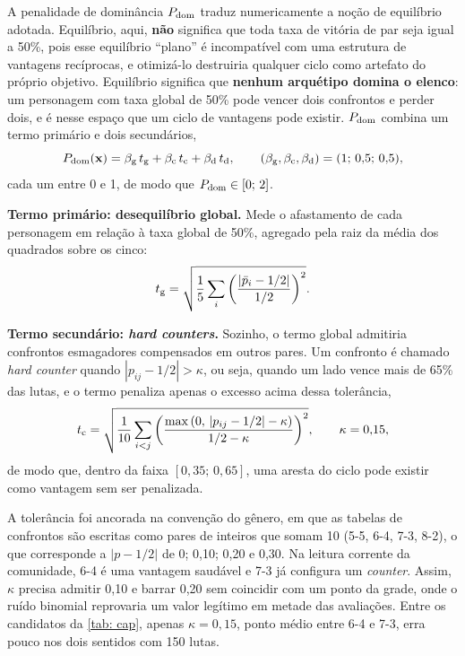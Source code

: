 A penalidade de dominância $P_{\mathrm{dom}}$ traduz numericamente a noção de equilíbrio adotada. Equilíbrio, aqui, \textbf{não} significa que toda taxa de vitória de par seja igual a 50\%, pois esse equilíbrio ``plano'' é incompatível com uma estrutura de vantagens recíprocas, e otimizá-lo destruiria qualquer ciclo como artefato do próprio objetivo. Equilíbrio significa que \textbf{nenhum arquétipo domina o elenco}: um personagem com taxa global de 50\% pode vencer dois confrontos e perder dois, e é nesse espaço que um ciclo de vantagens pode existir. $P_{\mathrm{dom}}$ combina um termo primário e dois secundários,
\begin{equation}
    \label{eq: dominancia}
    P_{\mathrm{dom}}(\mathbf{x}) = \beta_{\mathrm{g}}\, t_{\mathrm{g}} + \beta_{\mathrm{c}}\, t_{\mathrm{c}} + \beta_{\mathrm{d}}\, t_{\mathrm{d}},
    \qquad
    (\beta_{\mathrm{g}}, \beta_{\mathrm{c}}, \beta_{\mathrm{d}}) = (1;\, 0{,}5;\, 0{,}5),
\end{equation}
cada um entre 0 e 1, de modo que $P_{\mathrm{dom}} \in [0;\, 2]$.

\textbf{Termo primário: desequilíbrio global.} Mede o afastamento de cada personagem em relação à taxa global de 50\%, agregado pela raiz da média dos quadrados sobre os cinco:
\begin{equation}
    \label{eq: termo_global}
    t_{\mathrm{g}} = \sqrt{\frac{1}{5} \sum_{i} \left( \frac{|\bar{p}_i - 1/2|}{1/2} \right)^2}.
\end{equation}

\textbf{Termo secundário: \textit{hard counters}.} Sozinho, o termo global admitiria confrontos esmagadores compensados em outros pares. Um confronto é chamado \textit{hard counter} quando $|p_{ij} - 1/2| > \kappa$, ou seja, quando um lado vence mais de 65\% das lutas, e o termo penaliza apenas o excesso acima dessa tolerância,
\begin{equation}
    \label{eq: termo_cap}
    t_{\mathrm{c}} = \sqrt{\frac{1}{10} \sum_{i<j} \left( \frac{\max\left(0,\, |p_{ij} - 1/2| - \kappa\right)}{1/2 - \kappa} \right)^2},
    \qquad \kappa = 0{,}15,
\end{equation}
de modo que, dentro da faixa $[0{,}35;\, 0{,}65]$, uma aresta do ciclo pode existir como vantagem sem ser penalizada.

A tolerância foi ancorada na convenção do gênero, em que as tabelas de confrontos são escritas como pares de inteiros que somam 10 (5-5, 6-4, 7-3, 8-2), o que corresponde a $|p - 1/2|$ de 0; 0,10; 0,20 e 0,30. Na leitura corrente da comunidade, 6-4 é uma vantagem saudável e 7-3 já configura um \textit{counter}. Assim, $\kappa$ precisa admitir 0,10 e barrar 0,20 sem coincidir com um ponto da grade, onde o ruído binomial reprovaria um valor legítimo em metade das avaliações. Entre os candidatos da \autoref{tab: cap}, apenas $\kappa = 0{,}15$, ponto médio entre 6-4 e 7-3, erra pouco nos dois sentidos com 150 lutas.

